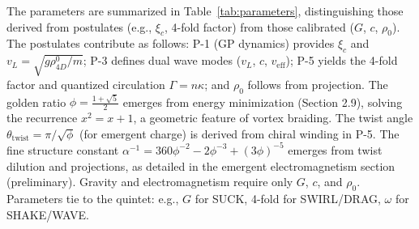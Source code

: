 The parameters are summarized in Table~\ref{tab:parameters}, distinguishing those derived from postulates (e.g., $\xi_c$, 4-fold factor) from those calibrated ($G$, $c$, $\rho_0$). The postulates contribute as follows: P-1 (GP dynamics) provides $\xi_c$ and $v_L = \sqrt{g \rho_{4D}^0 / m}$; P-3 defines dual wave modes ($v_L$, $c$, $v_{\text{eff}}$); P-5 yields the 4-fold factor and quantized circulation $\Gamma = n \kappa$; and $\rho_0$ follows from projection. The golden ratio $\phi = \frac{1 + \sqrt{5}}{2}$ emerges from energy minimization (Section 2.9), solving the recurrence $x^2 = x + 1$, a geometric feature of vortex braiding. The twist angle $\theta_{\text{twist}} = \pi / \sqrt{\phi}$ (for emergent charge) is derived from chiral winding in P-5. The fine structure constant $\alpha^{-1} = 360 \phi^{-2} - 2 \phi^{-3} + (3 \phi)^{-5}$ emerges from twist dilution and projections, as detailed in the emergent electromagnetism section (preliminary). Gravity and electromagnetism require only $G$, $c$, and $\rho_0$. Parameters tie to the quintet: e.g., $G$ for SUCK, 4-fold for SWIRL/DRAG, $\omega$ for SHAKE/WAVE.

